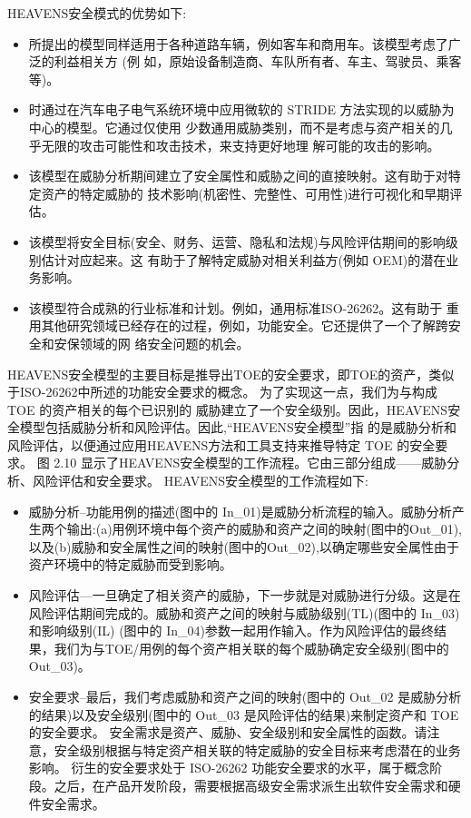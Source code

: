   HEAVENS安全模式的优势如下:

  \begin{itemize}
    \item  所提出的模型同样适用于各种道路车辆，例如客车和商用车。该模型考虑了广泛的利益相关方 (例
    如，原始设备制造商、车队所有者、车主、驾驶员、乘客等)。
    \item  时通过在汽车电子电气系统环境中应用微软的 STRIDE 方法实现的以威胁为中心的模型。它通过仅使用
    少数通用威胁类别，而不是考虑与资产相关的几乎无限的攻击可能性和攻击技术，来支持更好地理
    解可能的攻击的影响。
    \item  该模型在威胁分析期间建立了安全属性和威胁之间的直接映射。这有助于对特定资产的特定威胁的
    技术影响(机密性、完整性、可用性)进行可视化和早期评估。
    \item 该模型将安全目标(安全、财务、运营、隐私和法规)与风险评估期间的影响级别估计对应起来。这
    有助于了解特定威胁对相关利益方(例如 OEM)的潜在业务影响。
    \item 该模型符合成熟的行业标准和计划。例如，通用标准ISO-26262。这有助于
    重用其他研究领域已经存在的过程，例如，功能安全。它还提供了一个了解跨安全和安保领域的网
    络安全问题的机会。
\end{itemize}

HEAVENS安全模型的主要目标是推导出TOE的安全要求，即TOE的资产，类似于ISO-26262中所述的功能安全要求的概念。
为了实现这一点，我们为与构成 TOE 的资产相关的每个已识别的
威胁建立了一个安全级别。因此，HEAVENS安全模型包括威胁分析和风险评估。因此,“HEAVENS安全模型”指
的是威胁分析和风险评估，以便通过应用HEAVENS方法和工具支持来推导特定 TOE 的安全要求。
图 2.10 显示了HEAVENS安全模型的工作流程。它由三部分组成——威胁分析、风险评估和安全要求。
HEAVENS安全模型的工作流程如下:
\begin{itemize}
    \item  威胁分析–功能用例的描述(图中的 In\_01)是威胁分析流程的输入。威胁分析产生两个输出:(a)用例环境中每个资产的威胁和资产之间的映射(图中的Out\_01),
    以及(b)威胁和安全属性之间的映射(图中的Out\_02),以确定哪些安全属性由于资产环境中的特定威胁而受到影响。
    \item  风险评估—一旦确定了相关资产的威胁，下一步就是对威胁进行分级。这是在风险评估期间完成的。威胁和资产之间的映射与威胁级别(TL)(图中的 In\_03)和影响级别(IL)
    (图中的 In\_04)参数一起用作输入。作为风险评估的最终结果，我们为与TOE/用例的每个资产相关联的每个威胁确定安全级别(图中的 Out\_03)。
    \item  安全要求–最后，我们考虑威胁和资产之间的映射(图中的 Out\_02 是威胁分析的结果)以及安全级别(图中的 Out\_03 是风险评估的结果)来制定资产和 TOE 的安全要求。
    安全需求是资产、威胁、安全级别和安全属性的函数。请注意，安全级别根据与特定资产相关联的特定威胁的安全目标来考虑潜在的业务影响。
    衍生的安全要求处于 ISO-26262 功能安全要求的水平，属于概念阶段。之后，在产品开发阶段，需要根据高级安全需求派生出软件安全需求和硬件安全需求。
  \end{itemize}


